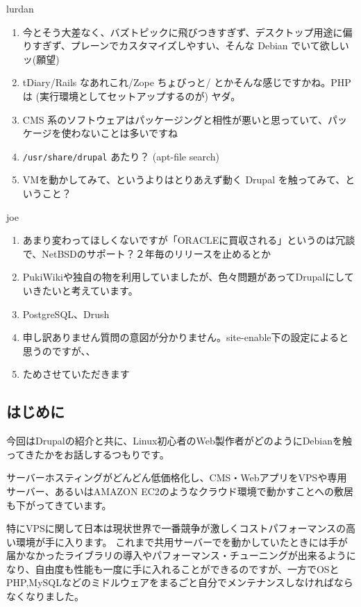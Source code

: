 \documentclass[mingoth,a4paper]{jsarticle}
\begin{document}
\begin{prework}{ lurdan }
  \begin{enumerate}
  \item 今とそう大差なく、バズトピックに飛びつきすぎず、デスクトップ用途に偏りすぎず、プレーンでカスタマイズしやすい、そんな Debian でいて欲しいッ(願望)
  \item tDiary/Rails なあれこれ/Zope ちょびっと/ とかそんな感じですかね。PHP は (実行環境としてセットアップするのが) ヤダ。
  \item CMS 系のソフトウェアはパッケージングと相性が悪いと思っていて、パッケージを使わないことは多いですね
  \item {\tt /usr/share/drupal} あたり？ (apt-file search)
  \item VMを動かしてみて、というよりはとりあえず動く Drupal を触ってみて、ということ？
  \end{enumerate}
\end{prework}

\begin{prework}{ joe }
  \begin{enumerate}
  \item あまり変わってほしくないですが「ORACLEに買収される」というのは冗談で、NetBSDのサポート？２年毎のリリースを止めるとか
  \item PukiWikiや独自の物を利用していましたが、色々問題があってDrupalにしていきたいと考えています。
  \item PostgreSQL、Drush
  \item 申し訳ありません質問の意図が分かりません。site-enable下の設定によると思うのですが、、
  \item ためさせていただきます
  \end{enumerate}
\end{prework}


\subsection{はじめに}

今回はDrupalの紹介と共に、Linux初心者のWeb製作者がどのようにDebianを触ってきたかをお話しするつもりです。

サーバーホスティングがどんどん低価格化し、CMS・WebアプリをVPSや専用サーバー、あるいはAMAZON EC2のようなクラウド環境で動かすことへの敷居も下がってきています。

特にVPSに関して日本は現状世界で一番競争が激しくコストパフォーマンスの高い環境が手に入ります。
これまで共用サーバーでを動かしていたときには手が届かなかったライブラリの導入やパフォーマンス・チューニングが出来るようになり、自由度も性能も一度に手に入れることができるのですが、一方でOSとPHP,MySQLなどのミドルウェアをまるごと自分でメンテナンスしなければならなくなりました。
\end{document}
